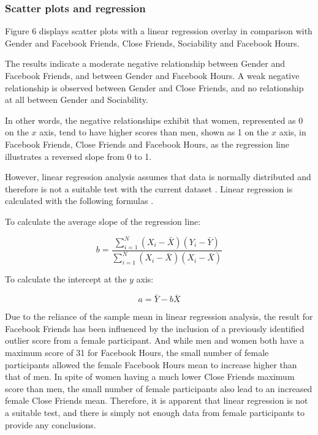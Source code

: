 
\subsubsection{Scatter plots and regression}

Figure 6 displays scatter plots with a linear regression overlay in comparison with Gender and Facebook Friends, Close Friends, Sociability and Facebook Hours.

The results indicate a moderate negative relationship between Gender and Facebook Friends, and between Gender and Facebook Hours. A weak negative relationship is observed between Gender and Close Friends, and no relationship at all between Gender and Sociability.

In other words, the negative relationships exhibit that women, represented as 0 on the $x$ axis, tend to have higher scores than men, shown as 1 on the $x$ axis, in Facebook Friends, Close Friends and Facebook Hours, as the regression line illustrates a reversed slope from 0 to 1.

However, linear regression analysis assumes that data is normally distributed and therefore is not a suitable test with the current dataset \citep[p. 263]{McKillup2011}. Linear regression is calculated with the following formulas \citep[p. 247-249]{McKillup2011}.\\
\linebreak

To calculate the average slope of the regression line:
 
$$b = \frac{\sum_{i=1}^N(X_i - \bar{X})(Y_i - \bar{Y})}{\sum_{i=1}^N(X_i - \bar{X})(X_i - \bar{X})}$$ \linebreak

To calculate the intercept at the $y$ axis:

$$a = \bar{Y} - b\bar{X}$$ \linebreak

Due to the reliance of the sample mean in linear regression analysis, the result for Facebook Friends has been influenced by the inclusion of a previously identified outlier score from a female participant. And while men and women both have a maximum score of 31 for Facebook Hours, the small number of female participants allowed the female Facebook Hours mean to increase higher than that of men. In spite of women having a much lower Close Friends maximum score than men, the small number of female participants also lead to an increased female Close Friends mean. Therefore, it is apparent that linear regression is not a suitable test, and there is simply not enough data from female participants to provide any conclusions.


